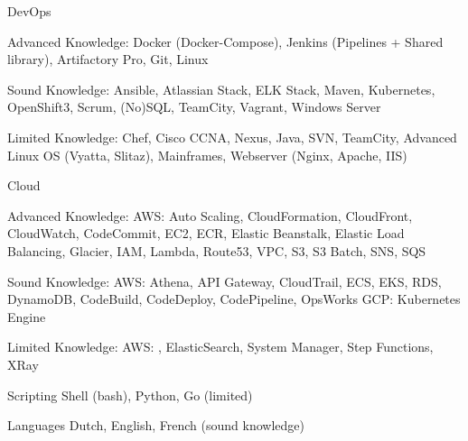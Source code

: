 

\begin{cvskills}

  \cvskill
    {DevOps} %
    {
      \begin{cvitems} %
        \item {Advanced Knowledge: Docker (Docker-Compose), Jenkins (Pipelines + Shared library), Artifactory Pro, Git, Linux}
        \item {Sound Knowledge: Ansible, Atlassian Stack, ELK Stack, Maven, Kubernetes, OpenShift3, Scrum, (No)SQL, TeamCity, Vagrant, Windows Server}
        \item {Limited Knowledge: Chef, Cisco CCNA, Nexus, Java, SVN, TeamCity, Advanced Linux OS (Vyatta, Slitaz), Mainframes, Webserver (Nginx, Apache, IIS)}
      \end{cvitems}
    }

  \cvskill
    {Cloud} %
    {
      \begin{cvitems} %
        \item {Advanced Knowledge: AWS: Auto Scaling, CloudFormation, CloudFront, CloudWatch, CodeCommit, EC2, ECR, Elastic Beanstalk, Elastic Load Balancing, Glacier, IAM, Lambda, Route53, VPC, S3, S3 Batch, SNS, SQS}
        \item {Sound Knowledge: AWS: Athena, API Gateway, CloudTrail, ECS, EKS, RDS, DynamoDB, CodeBuild, CodeDeploy, CodePipeline, OpsWorks GCP: Kubernetes Engine}
        \item {Limited Knowledge: AWS: , ElasticSearch, System Manager, Step Functions, XRay}
      \end{cvitems}
    }

  \cvskill
    {Scripting} %
    {Shell (bash), Python, Go (limited)} %

  \cvskill
    {Languages} %
    {Dutch, English, French (sound knowledge)} %

\end{cvskills}
